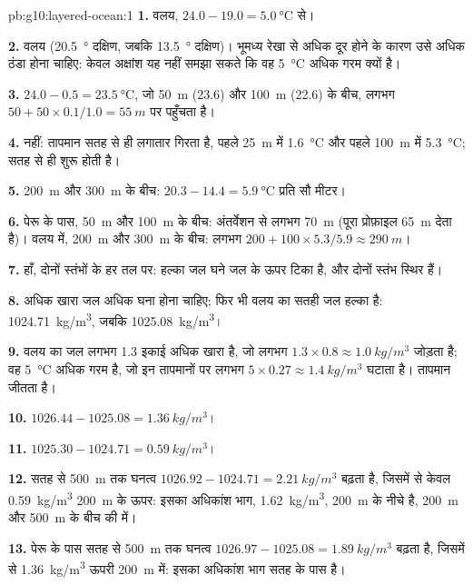 \begin{solution}{pb:g10:layered-ocean:1}
\textbf{1.} वलय, $24.0 - 19.0 = \qty{5.0}{\degreeCelsius}$ से।

\textbf{2.} वलय (\qty{20.5}{\degree} दक्षिण, जबकि \qty{13.5}{\degree} दक्षिण)।
भूमध्य रेखा से अधिक दूर होने के कारण उसे अधिक ठंडा होना चाहिए: केवल अक्षांश
यह नहीं समझा सकते कि वह \qty{5}{\degreeCelsius} अधिक गरम क्यों है।

\textbf{3.} $24.0 - 0.5 = \qty{23.5}{\degreeCelsius}$, जो
\qty{50}{m} (23.6) और \qty{100}{m} (22.6) के बीच, लगभग $50 + 50 \times
0.1/1.0 = \qty{55}{m}$ पर पहुँचता है।

\textbf{4.} नहीं: तापमान सतह से ही लगातार गिरता है, पहले \qty{25}{m} में
\qty{1.6}{\degreeCelsius} और पहले \qty{100}{m} में \qty{5.3}{\degreeCelsius};
 सतह से ही शुरू होती है।

\textbf{5.} \qty{200}{m} और \qty{300}{m} के बीच: $20.3 - 14.4 =
\qty{5.9}{\degreeCelsius}$ प्रति सौ मीटर।

\textbf{6.} पेरू के पास, \qty{50}{m} और \qty{100}{m} के बीच: अंतर्वेशन से लगभग
\qty{70}{m} (पूरा प्रोफ़ाइल \qty{65}{m} देता है)। वलय में,
\qty{200}{m} और \qty{300}{m} के बीच: लगभग $200 + 100 \times 5.3/5.9
\approx \qty{290}{m}$।

\textbf{7.} हाँ, दोनों स्तंभों के हर तल पर: हल्का जल घने
जल के ऊपर टिका है, और दोनों स्तंभ स्थिर हैं।

\textbf{8.} अधिक खारा जल अधिक घना होना चाहिए; फिर भी वलय का सतही जल
हल्का है: \qty{1024.71}{kg/m^3}, जबकि \qty{1025.08}{kg/m^3}।

\textbf{9.} वलय का जल लगभग 1.3 इकाई अधिक खारा है, जो लगभग
$1.3 \times 0.8 \approx \qty{1.0}{kg/m^3}$ जोड़ता है; वह \qty{5}{\degreeCelsius}
अधिक गरम है, जो इन तापमानों पर लगभग $5 \times 0.27 \approx \qty{1.4}{kg/m^3}$
घटाता है। तापमान जीतता है।

\textbf{10.} $1026.44 - 1025.08 = \qty{1.36}{kg/m^3}$।

\textbf{11.} $1025.30 - 1024.71 = \qty{0.59}{kg/m^3}$।

\textbf{12.} सतह से \qty{500}{m} तक घनत्व
$1026.92 - 1024.71 = \qty{2.21}{kg/m^3}$ बढ़ता है, जिसमें से केवल \qty{0.59}{kg/m^3}
\qty{200}{m} के ऊपर: इसका अधिकांश भाग, \qty{1.62}{kg/m^3}, \qty{200}{m} के नीचे है,
\qty{200}{m} और \qty{500}{m} के बीच की  में।

\textbf{13.} पेरू के पास सतह से \qty{500}{m} तक घनत्व $1026.97 - 1025.08 =
\qty{1.89}{kg/m^3}$ बढ़ता है, जिसमें से
\qty{1.36}{kg/m^3} ऊपरी \qty{200}{m} में: इसका अधिकांश भाग सतह के पास है।


\end{solution}
